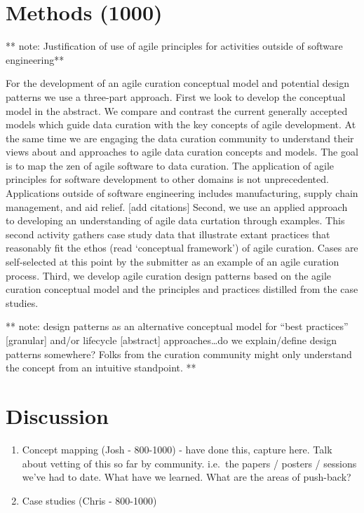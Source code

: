 \documentclass[paper]{ijdc-v9}
\begin{document}
\section{Methods (1000)}\label{methods-1000}

** note: Justification of use of agile principles for activities outside
of software engineering**

For the development of an agile curation conceptual model and potential
design patterns we use a three-part approach. First we look to develop
the conceptual model in the abstract. We compare and contrast the
current generally accepted models which guide data curation with the key
concepts of agile development. At the same time we are engaging the data
curation community to understand their views about and approaches to
agile data curation concepts and models. The goal is to map the zen of
agile software to data curation. The application of agile principles for
software development to other domains is not unprecedented. Applications
outside of software engineering includes manufacturing, supply chain
management, and aid relief. {[}add citations{]} Second, we use an
applied approach to developing an understanding of agile data curtation
through examples. This second activity gathers case study data that
illustrate extant practices that reasonably fit the ethos (read
`conceptual framework') of agile curation. Cases are self-selected at
this point by the submitter as an example of an agile curation process.
Third, we develop agile curation design patterns based on the agile
curation conceptual model and the principles and practices distilled
from the case studies.

** note: design patterns as an alternative conceptual model for ``best
practices'' {[}granular{]} and/or lifecycle {[}abstract{]}
approaches\ldots{}do we explain/define design patterns somewhere? Folks
from the curation community might only understand the concept from an
intuitive standpoint. **

\section{Discussion}\label{discussion}

\begin{enumerate}
\def\labelenumi{\arabic{enumi}.}
\item
  Concept mapping (Josh - 800-1000) - have done this, capture here. Talk
  about vetting of this so far by community. i.e.~the papers / posters /
  sessions we've had to date. What have we learned. What are the areas
  of push-back?
\item
  Case studies (Chris - 800-1000)
\end{enumerate}
\end{document}
